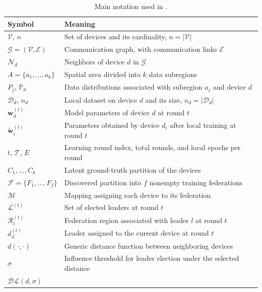 \begin{table}
  \centering
  \small
  \caption{Main notation used in .}
  \label{tab:selforgfl-notation}
  \begin{tabular}{@{}p{}p{}@{}}
    \toprule
    Symbol & Meaning \\
    \midrule
    $\mathcal{V}$, $n$
      & Set of devices and its cardinality, $n=|\mathcal{V}|$ \\
    $\mathcal{G}=(\mathcal{V},\mathcal{E})$
      & Communication graph, with communication links $\mathcal{E}$ \\
    $\mathcal{N}_d$
      & Neighbors of device $d$ in $\mathcal{G}$ \\
    $A=\{a_1,\ldots,a_k\}$
      & Spatial area divided into $k$ data subregions \\
    $P_j$, $\mathbb{P}_d$
      & Data distributions associated with subregion $a_j$ and device $d$ \\
    $\mathcal{D}_d$, $n_d$
      & Local dataset on device $d$ and its size, $n_d=|\mathcal{D}_d|$ \\
    $\mathbf{w}_d^{(t)}$
      & Model parameters of device $d$ at round $t$ \\
    $\widetilde{\mathbf{w}}_i^{(t)}$
      & Parameters obtained by device $d_i$ after local training at round $t$ \\
    $t$, $\mathcal{T}$, $E$
      & Learning round index, total rounds, and local epochs per round \\
    $C_1,\ldots,C_k$
      & Latent ground-truth partition of the devices \\
    $\mathcal{F}=\{F_1,\ldots,F_f\}$
      & Discovered partition into $f$ nonempty training federations \\
    $\mathcal{M}$
      & Mapping assigning each device to its federation \\
    $\mathcal{L}^{(t)}$
      & Set of elected leaders at round $t$ \\
    $\mathcal{R}_l^{(t)}$
      & Federation region associated with leader $l$ at round $t$ \\
    $d_{\mathcal{L}}^{(t)}$
      & Leader assigned to the current device at round $t$ \\
    $d(\cdot,\cdot)$
      & Generic distance function between neighboring devices \\
    $\sigma$
      & Influence threshold for leader election under the selected distance \\
    $\mathcal{DL}(d,\sigma)$

\end{tabular}
\end{table}
